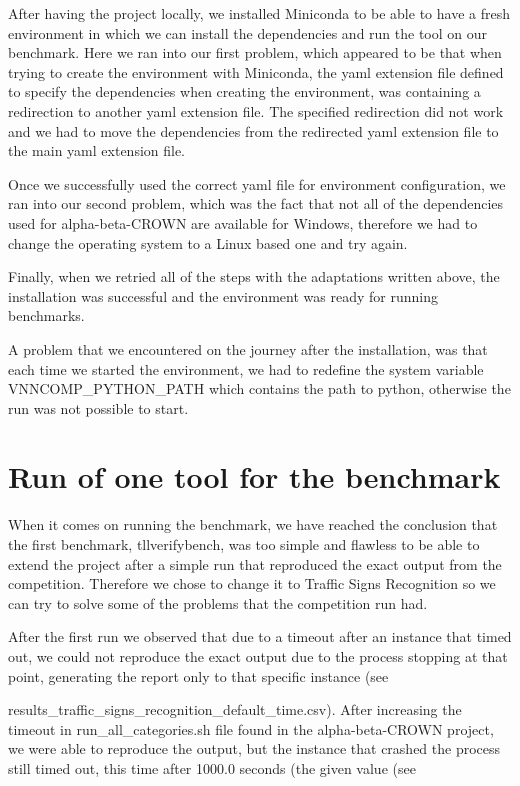 \documentclass[12pt,a4paper]{report}
\newcommand\tab[1][5mm]{\hspace*{#1}}
\theoremstyle{definition}
\theoremstyle{remark}
\begin{document}
After having the project locally, we installed Miniconda\cite{miniconda} to be able to have a fresh environment in which we can install the dependencies and run the tool on our benchmark. Here we ran into our first problem, which appeared to be that when trying to create the environment with Miniconda\cite{miniconda}, the yaml extension file defined to specify the dependencies when creating the environment, was containing a redirection to another yaml extension file. The specified redirection did not work and we had to move the dependencies from the redirected yaml extension file to the main yaml extension file.

Once we successfully used the correct yaml file for environment configuration, we ran into our second problem, which was the fact that not all of the dependencies used for alpha-beta-CROWN are available for Windows, therefore we had to change the operating system to a Linux based one and try again.

Finally, when we retried all of the steps with the adaptations written above, the installation was successful and the environment was ready for running benchmarks.

A problem that we encountered on the journey after the installation, was that each time we started the environment, we had to redefine the system variable VNNCOMP\_PYTHON\_PATH which contains the path to python, otherwise the run was not possible to start.
\chapter{Run of one tool for the benchmark}
\tab When it comes on running the benchmark, we have reached the conclusion that the first benchmark, tllverifybench\cite{tll_verify_bench}, was too simple and flawless to be able to extend the project after a simple run that reproduced the exact output from the competition. Therefore we chose to change it to Traffic Signs Recognition\cite{traffic_signs_recognition} so we can try to solve some of the problems that the competition run had.

After the first run we observed that due to a timeout after an instance that timed out, we could not reproduce the exact output due to the process stopping at that point, generating the report only to that specific instance (see

results\_traffic\_signs\_recognition\_default\_time.csv\cite{traffic_signs_recognition_first_solution}). After increasing the timeout in run\_all\_categories.sh file found in the alpha-beta-CROWN project, we were able to reproduce the output, but the instance that crashed the process still timed out, this time after 1000.0 seconds (the given value (see
\end{document}
